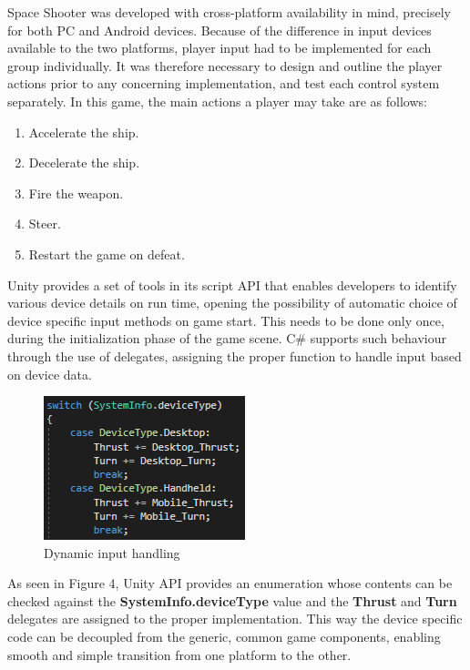 Space Shooter was developed with cross-platform availability in mind, precisely for both PC and Android devices. Because of the difference in input devices available to the two platforms, player input had to be implemented for each group individually. It was therefore necessary to design and outline the player actions prior to any concerning implementation, and test each control system separately. In this game, the main actions a player may take are as follows:
\begin{enumerate}
\item\label{th:radnil} Accelerate the ship.
\item\label{th:finsim} Decelerate the ship.
\item\label{th:leftnoe} Fire the weapon.
\item\label{th:leftnoe} Steer.
\item\label{th:leftnoe} Restart the game on defeat.
\end{enumerate}
Unity provides a set of tools in its script API that enables developers to identify various device details on run time, opening the possibility of automatic choice of device specific input methods on game start. This needs to be done only once, during the initialization phase of the game scene. C\# supports such behaviour through the use of delegates, assigning the proper function to handle input based on device data.\\
\begin{figure}
  \centering
  \includegraphics[width=0.6\linewidth]{images/inputdelegate}
  \caption{Dynamic input handling}
  \label{fig}
\end{figure}
As seen in Figure 4, Unity API provides an enumeration whose contents can be checked against the \textbf{SystemInfo.deviceType} value and the \textbf{Thrust} and \textbf{Turn} delegates are assigned to the proper implementation. This way the device specific code can be decoupled from the generic, common game components, enabling smooth and simple transition from one platform to the other. \\ 
